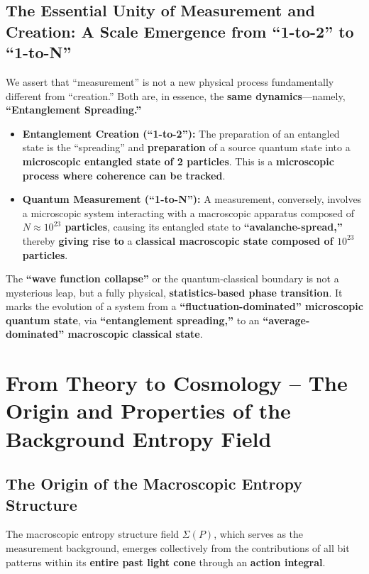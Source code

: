 \documentclass[11pt]{article}
\begin{document}
\subsection{The Essential Unity of Measurement and Creation: A Scale Emergence from ``1-to-2'' to ``1-to-N''}
We assert that ``measurement'' is not a new physical process fundamentally different from ``creation.'' Both are, in essence, the \textbf{same dynamics}—namely, \textbf{``Entanglement Spreading.''}

\begin{itemize}
    \item   \textbf{Entanglement Creation (``1-to-2''):} The preparation of an entangled state is the ``spreading'' and \textbf{preparation} of a source quantum state into a \textbf{microscopic entangled state of 2 particles}. This is a \textbf{microscopic process where coherence can be tracked}.
    \item   \textbf{Quantum Measurement (``1-to-N''):} A measurement, conversely, involves a microscopic system interacting with a macroscopic apparatus composed of \textbf{$N \approx 10^{23}$ particles}, causing its entangled state to \textbf{``avalanche-spread,''} thereby \textbf{giving rise to} a \textbf{classical macroscopic state composed of $10^{23}$ particles}.
\end{itemize}

\noindent The \textbf{``wave function collapse''} or the quantum-classical boundary is not a mysterious leap, but a fully physical, \textbf{statistics-based phase transition}. It marks the evolution of a system from a \textbf{``fluctuation-dominated'' microscopic quantum state}, via \textbf{``entanglement spreading,''} to an \textbf{``average-dominated'' macroscopic classical state}.


\section{From Theory to Cosmology -- The Origin and Properties of the Background Entropy Field}

\subsection{The Origin of the Macroscopic Entropy Structure}
The macroscopic entropy structure field $\Sigma(P)$, which serves as the measurement background, emerges collectively from the contributions of all bit patterns within its \textbf{entire past light cone} through an \textbf{action integral}.
\end{document}
